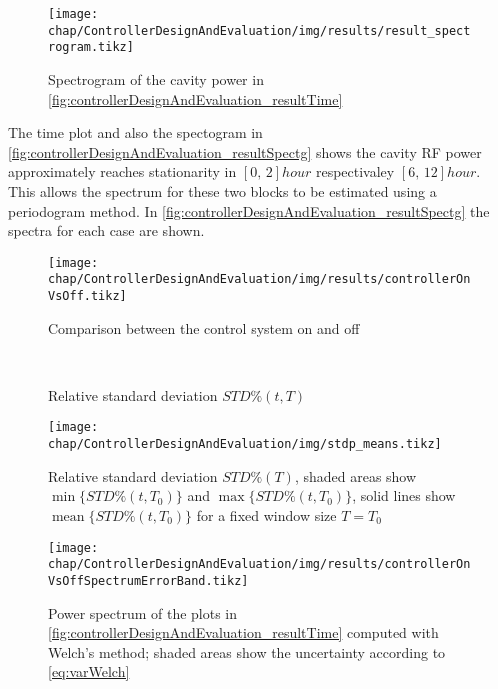 \begin{figure}[tbh]
	\centering
	\texttt{[image: chap/ControllerDesignAndEvaluation/img/results/result\_spectrogram.tikz]}
	\caption{Spectrogram of the cavity power in \autoref{fig:controllerDesignAndEvaluation_resultTime}}
	\label{fig:controllerDesignAndEvaluation_resultSpectg}
\end{figure}

The time plot and also the spectogram in \autoref{fig:controllerDesignAndEvaluation_resultSpectg} shows the cavity RF power approximately reaches stationarity in $[0,\,2] \si{hour}$ respectivaley $[6,\,12] \si{hour}$. This allows the spectrum for these two blocks to be estimated using a periodogram method. In \autoref{fig:controllerDesignAndEvaluation_resultSpectg} the spectra for each case are shown.

\begin{figure}[tbh]
	\centering
	\texttt{[image: chap/ControllerDesignAndEvaluation/img/results/controllerOnVsOff.tikz]}
	\caption{Comparison between the control system on and off}
	\label{fig:controllerDesignAndEvaluation_resultComp}
\end{figure}

\begin{figure}[tbh]
    \centering
        \\
       \caption{Relative standard deviation $STD\%(t,T)$}
    \label{fig:controllerDesignAndEvaluation_resultSTDp}
\end{figure}

\begin{figure}[tbh]
	\centering
	\texttt{[image: chap/ControllerDesignAndEvaluation/img/stdp\_means.tikz]}
	\caption{Relative standard deviation $STD\%(T)$, shaded areas show $\operatorname{min}\{STD\%(t,T_0)\}$ and $\operatorname{max}\{STD\%(t,T_0)\}$, solid lines show $\operatorname{mean}\{STD\%(t,T_0)\}$ for a fixed window size $T=T_0$}
	\label{fig:controllerDesignAndEvaluation_resultSTDp_means}
\end{figure}


\begin{figure}[tbh]
	\centering
	\texttt{[image: chap/ControllerDesignAndEvaluation/img/results/controllerOnVsOffSpectrumErrorBand.tikz]}
	\caption{Power spectrum of the plots in \autoref{fig:controllerDesignAndEvaluation_resultTime} computed with Welch's method; shaded areas show the uncertainty according to \autoref{eq:varWelch}}
	\label{fig:controllerDesignAndEvaluation_resultPeriodo}
\end{figure}

